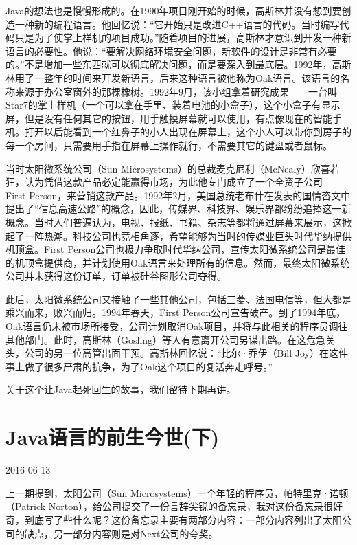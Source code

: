 \documentclass[
  letterpaper,
  DIV=11,
  numbers=noendperiod]{scrreprt}
\begin{document}
Java的想法也是慢慢形成的。在1990年项目刚开始的时候，高斯林并没有想到要创造一种新的编程语言。他回忆说：``它开始只是改进C++语言的代码。当时编写代码只是为了使掌上样机的项目成功。''随着项目的进展，高斯林才意识到开发一种新语言的必要性。他说：``要解决网络环境安全问题，新软件的设计是非常有必要的。''不是增加一些东西就可以彻底解决问题，而是要深入到最底层。1992年，高斯林用了一整年的时间来开发新语言，后来这种语言被他称为Oak语言。该语言的名称来源于办公室窗外的那棵橡树。1992年9月，该小组拿着研究成果------一台叫Star7的掌上样机（一个可以拿在手里、装着电池的小盒子），这个小盒子有显示屏，但是没有任何其它的按钮，用手触摸屏幕就可以使用，有点像现在的智能手机。打开以后能看到一个红鼻子的小人出现在屏幕上，这个小人可以带你到房子的每一个房间，只需要用手指在屏幕上操作就行，不需要其它的键盘或者鼠标。

当时太阳微系统公司（Sun
Microsystems）的总裁麦克尼利（McNealy）欣喜若狂，认为凭借这款产品必定能赢得市场，为此他专门成立了一个全资子公司------First
Person，来营销这款产品。1992年2月，美国总统老布什在发表的国情咨文中提出了``信息高速公路''的概念，因此，传媒界、科技界、娱乐界都纷纷追捧这一新概念。当时人们普遍认为，电视、报纸、书籍、杂志等都将通过屏幕来展示，这掀起了一阵热潮。科技公司也竞相角逐，希望能够为当时的传媒业巨头时代华纳提供机顶盒。First
Person公司也极力争取时代华纳公司，宣传太阳微系统公司是最佳的机顶盒提供商，并计划使用Oak语言来处理所有的信息。然而，最终太阳微系统公司并未获得这份订单，订单被硅谷图形公司夺得。

此后，太阳微系统公司又接触了一些其他公司，包括三菱、法国电信等，但大都是乘兴而来，败兴而归。1994年春天，First
Person公司宣告破产。到了1994年底，Oak语言仍未被市场所接受，公司计划取消Oak项目，并将与此相关的程序员调往其他部门。此时，高斯林（Gosling）等人有意离开公司另谋出路。在这危急关头，公司的另一位高管出面干预。高斯林回忆说：``比尔·乔伊（Bill
Joy）在这件事上做了很多严肃的抗争，为了Oak这个项目的复活奔走呼号。''

关于这个让Java起死回生的故事，我们留待下期再讲。


\chapter{Java语言的前生今世(下)}\label{javaux8bedux8a00ux7684ux524dux751fux4ecaux4e16ux4e0b}

2016-06-13

上一期提到，太阳公司（Sun
Microsystems）一个年轻的程序员，帕特里克·诺顿（Patrick
Norton），给公司提交了一份言辞尖锐的备忘录，我对这份备忘录很好奇，到底写了些什么呢？这份备忘录主要有两部分内容：一部分内容列出了太阳公司的缺点，另一部分内容则是对Next公司的夸奖。
\end{document}
